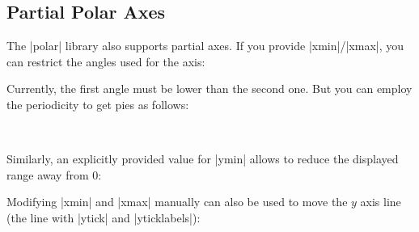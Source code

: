 {\subsection{Partial Polar Axes}
The |polar| library also supports partial axes. If you provide |xmin|/|xmax|, you can restrict the angles used for the axis:
\begin{codeexample}[]
\end{codeexample}

Currently, the first angle must be lower than the second one. But you can employ the periodicity to get pies as follows:
%
\begin{codeexample}[]
~%
\end{codeexample}
\noindent Similarly, an explicitly provided value for |ymin| allows to reduce the displayed range away from $0$:
\begin{codeexample}[]
\end{codeexample}

\noindent Modifying |xmin| and |xmax| manually can also be used to move the $y$ axis line (the line with |ytick| and |yticklabels|):
\begin{codeexample}[]
\end{codeexample}
}
